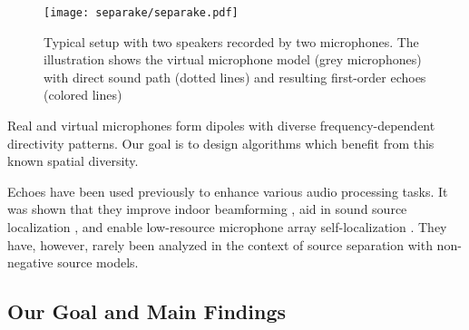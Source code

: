 \begin{figure}
    \centering
    \texttt{[image: separake/separake.pdf]}
    \caption{Typical setup with two speakers recorded by two microphones. The illustration shows the virtual microphone model (grey microphones) with direct sound path (dotted lines) and resulting first-order echoes (colored lines)}
    \label{fig:separake:setup}
    \vspace{-0mm}
\end{figure}

Real and virtual microphones form dipoles with diverse frequency-dependent directivity patterns.
Our goal is to design algorithms which benefit from this known spatial diversity.


Echoes have been used previously to enhance various audio processing tasks.
It was shown that they improve indoor beamforming ,
aid in sound source localization ,
and enable low-resource microphone array self-localization .
They have, however, rarely been analyzed in the context of source separation with non-negative source models.

\subsection{Our Goal and Main Findings}

